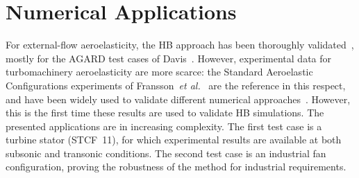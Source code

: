 \section{Numerical Applications}
For external-flow aeroelasticity, the HB approach has been thoroughly validated~\cite{Gopinath2005,Sicot2008,Woodgate2009,Dufour2010}, mostly for the AGARD test cases of Davis~\cite{Davis1982}. However, experimental data for turbomachinery aeroelasticity are more scarce: the Standard Aeroelastic Configurations experiments of Fransson~\textit{et al.}~\cite{Fransson:1999uq} are the reference in this respect, and have been widely used to validate different numerical approaches~\cite{Sbardella:2001fk,Duta:2002uq,Campobasso:2003fk,Cinnella2004,mcbean2005}. However, this is the first time these results are used to validate HB simulations. %
The presented applications are in increasing complexity.  The first
test case is a turbine stator (STCF~11), for which experimental results are available at both subsonic and transonic conditions.  %
The second test case is an industrial fan configuration, proving the
robustness of the method for industrial requirements.



